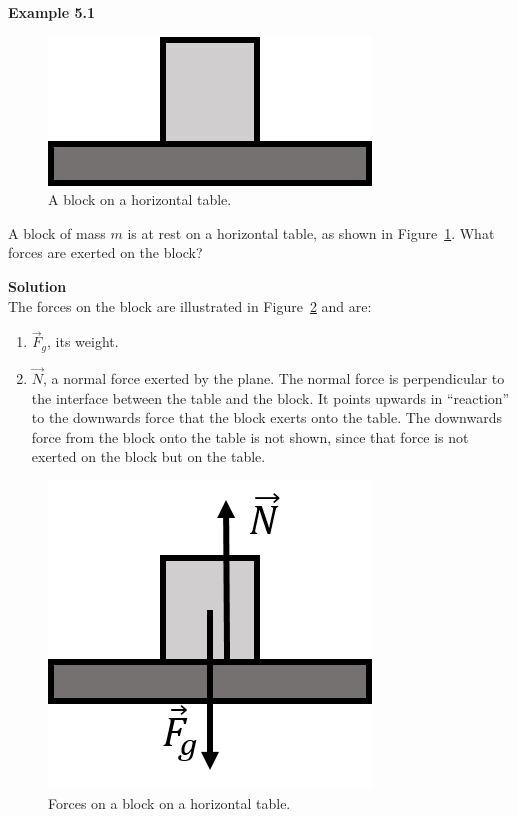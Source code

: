 \begin{framed}
\textbf{Example 5.1}\\
\begin{figure}[!htbp]
\centering
\includegraphics[width=0.2\linewidth]{files/blockH-37f13335eeee7e4dfbf9e4e15d1d06e2.png}
\caption[]{A block on a horizontal table.}
\label{fig:newtonslaws:blockH}
\end{figure}

A block of mass $m$ is at rest on a horizontal table, as shown in Figure~\ref{fig:newtonslaws:blockH}. What forces are exerted on the block?

\begin{framed}
\textbf{Solution}\\
The forces on the block are illustrated in Figure~\ref{fig:newtonslaws:blockH_forces} and are:

\begin{enumerate}
\item $\vec F_g$, its weight.
\item $\vec N$, a normal force exerted by the plane. The normal force is perpendicular to the interface between the table and the block. It points upwards in ``reaction'' to the downwards force that the block exerts onto the table. The downwards force from the block onto the table is not shown, since that force is not exerted on the block but on the table.
\end{enumerate}

\begin{figure}[!htbp]
\centering
\includegraphics[width=0.2\linewidth]{files/blockH_forces-9de9eaa73395c6a6eec19d08d59ee2a0.png}
\caption[]{Forces on a block on a horizontal table.}
\label{fig:newtonslaws:blockH_forces}
\end{figure}
\end{framed}
\end{framed}


